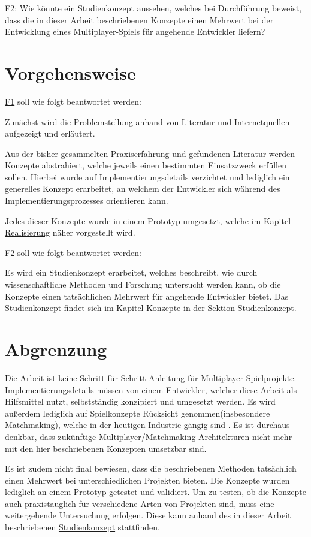 \label{f2} \textsf{\Large F2:} Wie könnte ein Studienkonzept aussehen, welches bei Durchführung beweist, dass die in dieser Arbeit beschriebenen Konzepte einen Mehrwert bei der Entwicklung eines Multiplayer-Spiels für angehende Entwickler liefern?


\section{Vorgehensweise}

\hyperref[f1]{F1} soll wie folgt beantwortet werden:

Zunächst wird die Problemstellung anhand von Literatur und Internetquellen aufgezeigt und erläutert. 

Aus der bisher gesammelten Praxiserfahrung und gefundenen Literatur werden Konzepte abstrahiert, welche jeweils einen bestimmten Einsatzzweck erfüllen sollen. Hierbei wurde auf Implementierungsdetails verzichtet und lediglich ein generelles Konzept erarbeitet, an welchem der Entwickler sich während des Implementierungsprozesses orientieren kann.

Jedes dieser Konzepte wurde in einem Prototyp umgesetzt, welche im Kapitel \hyperref[sec:realisierung]{Realisierung} näher vorgestellt wird.

\hyperref[f2]{F2} soll wie folgt beantwortet werden:

Es wird ein Studienkonzept erarbeitet, welches beschreibt, wie durch wissenschaftliche Methoden und Forschung untersucht werden kann, ob die Konzepte einen tatsächlichen Mehrwert für angehende Entwickler bietet. Das Studienkonzept findet sich im Kapitel \hyperref[sec:konzepte]{Konzepte} in der Sektion \hyperref[studienkonzept]{Studienkonzept}.

\section{Abgrenzung}

Die Arbeit ist keine Schritt-für-Schritt-Anleitung für Multiplayer-Spielprojekte. Implementierungsdetails müssen von einem Entwickler, welcher diese Arbeit als Hilfsmittel nutzt, selbstständig konzipiert und umgesetzt werden. Es wird außerdem lediglich auf Spielkonzepte Rücksicht genommen(insbesondere Matchmaking), welche in der heutigen Industrie gängig sind \cite{Wikipedia.2021b}. Es ist durchaus denkbar, dass zukünftige Multiplayer/Matchmaking Architekturen nicht mehr mit den hier beschriebenen Konzepten umsetzbar sind.

Es ist zudem nicht final bewiesen, dass die beschriebenen Methoden tatsächlich einen Mehrwert bei unterschiedlichen Projekten bieten. Die Konzepte wurden lediglich an einem Prototyp getestet und validiert. Um zu testen, ob die Konzepte auch praxistauglich für verschiedene Arten von Projekten sind, muss eine weitergehende Untersuchung erfolgen. Diese kann anhand des in dieser Arbeit beschriebenen \hyperref[studienkonzept]{Studienkonzept} stattfinden. 

